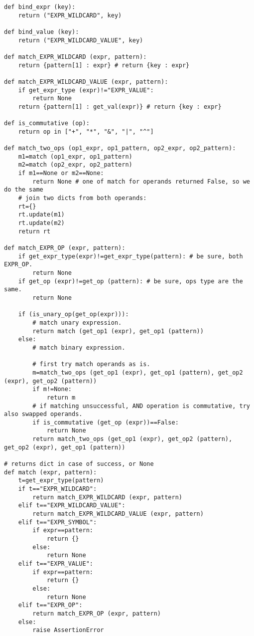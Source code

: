 ﻿\documentclass[12pt]{article}
\begin{document}
\begin{lstlisting}
def bind_expr (key):
    return ("EXPR_WILDCARD", key)

def bind_value (key):
    return ("EXPR_WILDCARD_VALUE", key)

def match_EXPR_WILDCARD (expr, pattern):
    return {pattern[1] : expr} # return {key : expr}

def match_EXPR_WILDCARD_VALUE (expr, pattern):
    if get_expr_type (expr)!="EXPR_VALUE":
        return None
    return {pattern[1] : get_val(expr)} # return {key : expr}

def is_commutative (op):
    return op in ["+", "*", "&", "|", "^"]

def match_two_ops (op1_expr, op1_pattern, op2_expr, op2_pattern):
    m1=match (op1_expr, op1_pattern)
    m2=match (op2_expr, op2_pattern)
    if m1==None or m2==None:
        return None # one of match for operands returned False, so we do the same
    # join two dicts from both operands:
    rt={}
    rt.update(m1)
    rt.update(m2)
    return rt

def match_EXPR_OP (expr, pattern):
    if get_expr_type(expr)!=get_expr_type(pattern): # be sure, both EXPR_OP.
        return None
    if get_op (expr)!=get_op (pattern): # be sure, ops type are the same.
        return None

    if (is_unary_op(get_op(expr))):
        # match unary expression.
        return match (get_op1 (expr), get_op1 (pattern))
    else:     
        # match binary expression.     

        # first try match operands as is.
        m=match_two_ops (get_op1 (expr), get_op1 (pattern), get_op2 (expr), get_op2 (pattern))
        if m!=None:
            return m
        # if matching unsuccessful, AND operation is commutative, try also swapped operands.
        if is_commutative (get_op (expr))==False:
            return None
        return match_two_ops (get_op1 (expr), get_op2 (pattern), get_op2 (expr), get_op1 (pattern))

# returns dict in case of success, or None
def match (expr, pattern):
    t=get_expr_type(pattern)
    if t=="EXPR_WILDCARD":
        return match_EXPR_WILDCARD (expr, pattern)
    elif t=="EXPR_WILDCARD_VALUE":
        return match_EXPR_WILDCARD_VALUE (expr, pattern)
    elif t=="EXPR_SYMBOL":
        if expr==pattern:
            return {}
        else:
            return None
    elif t=="EXPR_VALUE":
        if expr==pattern:
            return {}
        else:
            return None
    elif t=="EXPR_OP":
        return match_EXPR_OP (expr, pattern)
    else:
        raise AssertionError
\end{lstlisting}
\end{document}
